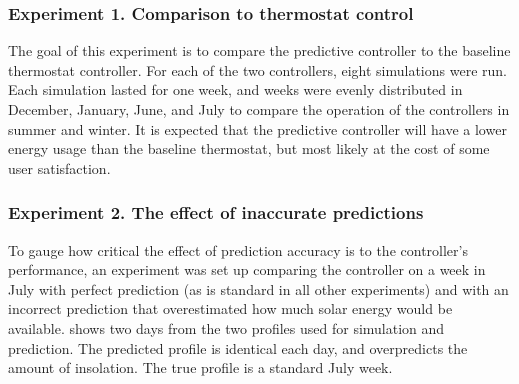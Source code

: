 \subsubsection{Experiment 1. Comparison to thermostat control}

The goal of this experiment is to compare the predictive controller to the baseline thermostat controller.
For each of the two controllers, eight simulations were run.
Each simulation lasted for one week, and weeks were evenly distributed in December, January, June, and July to compare the operation of the controllers in summer and winter.
It is expected that the predictive controller will have a lower energy usage than the baseline thermostat, but most likely at the cost of some user satisfaction.

\subsubsection{Experiment 2. The effect of inaccurate predictions}

To gauge how critical the effect of prediction accuracy is to the controller's performance, an experiment was set up comparing the controller on a week in July with perfect prediction (as is standard in all other experiments) and with an incorrect prediction that overestimated how much solar energy would be available.
 shows two days from the two profiles used for simulation and prediction.
The predicted profile is identical each day, and overpredicts the amount of insolation.
The true profile is a standard July week.

